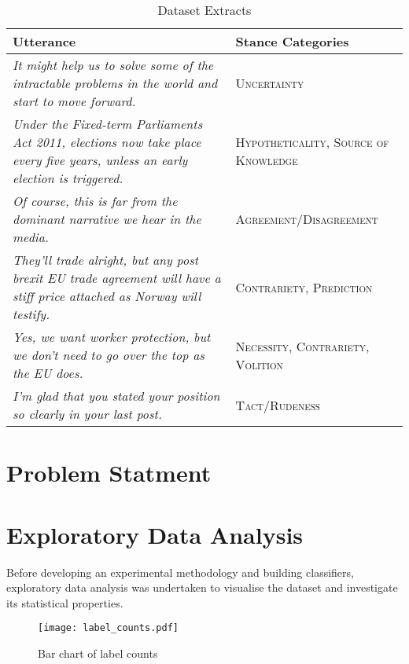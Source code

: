 \documentclass[Dissertation.tex]{subfiles}
\begin{document}
{\renewcommand{\arraystretch}{1.5}
	\centering
\begin{table}[]
	\caption{Dataset Extracts
	\label{tab:dataExtracts}}
	\begin{tabularx}{\textwidth}{>{\raggedright}X >{\raggedright \arraybackslash}p{5cm}}
		\toprule
		Utterance 											& Stance Categories \\ \midrule
		\itshape It might help us to solve some of the intractable problems in the world and start to move forward. &\small\scshape Uncertainty \\
		\itshape Under the Fixed-term Parliaments Act 2011, elections now take place every five years, unless an early election is triggered. &\small\scshape  Hypotheticality, Source of Knowledge \\
		\itshape Of course, this is far from the dominant narrative we hear in the media. & \small\scshape Agreement/Disagreement \\
		\itshape They’ll trade alright, but any post brexit EU trade agreement will have a stiff price attached as Norway will testify. &\small\scshape  Contrariety, Prediction\\
		\itshape Yes, we want worker protection, but we don’t need to go over the top as the EU does. & \small\scshape Necessity, Contrariety, Volition\\
		\itshape I’m glad that you stated your position so clearly in your last post. &\small\scshape  Tact/Rudeness
		 \\\bottomrule
		
	\end{tabularx}

\end{table}}
\section{Problem Statment}

\section{Exploratory Data Analysis} \label{sec:EDA}
Before developing an experimental methodology and building classifiers, exploratory data analysis was undertaken to visualise the dataset and investigate its statistical properties.


\begin{figure}
	\centering
	\texttt{[image: label\_counts.pdf]}
	\caption{Bar chart of label counts}
	\label{fig:labelBarChart}
\end{figure}
\end{document}
